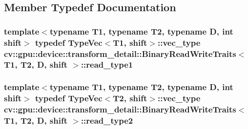 \subsection{Member Typedef Documentation}
\hypertarget{structcv_1_1gpu_1_1device_1_1transform__detail_1_1BinaryReadWriteTraits_a8174c130d50b5ef07f583f0ce6307d50}{
\subsubsection[{read\-\_\-type1}]{\setlength{\rightskip}{0pt plus 5cm}template$<$typename T1, typename T2, typename D, int shift$>$ typedef {\bf Type\-Vec}$<$T1, shift$>$\-::vec\-\_\-type {\bf cv\-::gpu\-::device\-::transform\-\_\-detail\-::\-Binary\-Read\-Write\-Traits}$<$ T1, T2, D, shift $>$\-::{\bf read\-\_\-type1}}}\label{structcv_1_1gpu_1_1device_1_1transform__detail_1_1BinaryReadWriteTraits_a8174c130d50b5ef07f583f0ce6307d50}
\hypertarget{structcv_1_1gpu_1_1device_1_1transform__detail_1_1BinaryReadWriteTraits_abfa1dd86230812afe07c3af47bf9bb2f}{
\subsubsection[{read\-\_\-type2}]{\setlength{\rightskip}{0pt plus 5cm}template$<$typename T1, typename T2, typename D, int shift$>$ typedef {\bf Type\-Vec}$<$T2, shift$>$\-::vec\-\_\-type {\bf cv\-::gpu\-::device\-::transform\-\_\-detail\-::\-Binary\-Read\-Write\-Traits}$<$ T1, T2, D, shift $>$\-::{\bf read\-\_\-type2}}}\label{structcv_1_1gpu_1_1device_1_1transform__detail_1_1BinaryReadWriteTraits_abfa1dd86230812afe07c3af47bf9bb2f}
